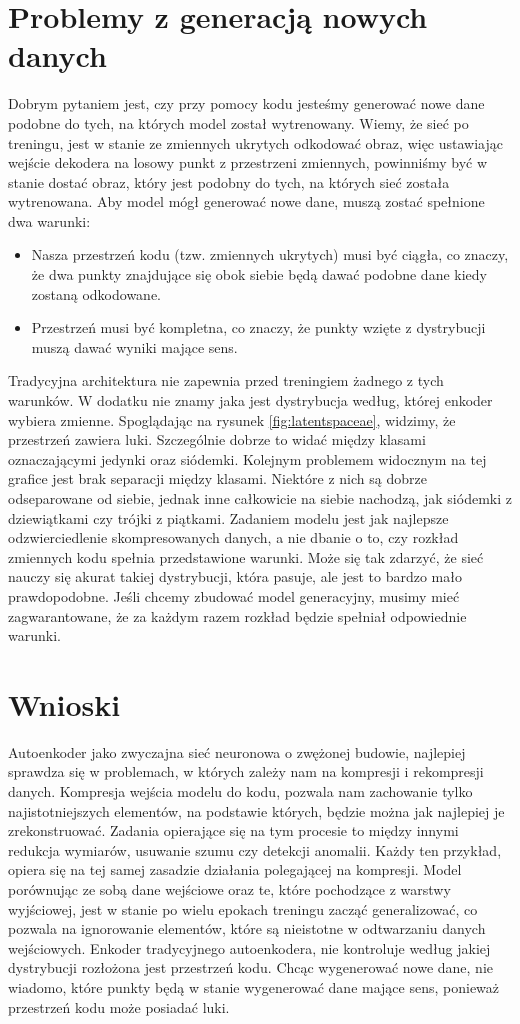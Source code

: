 \documentclass[a4paper,12pt,oneside]{book} %
\begin{document}
\section{Problemy z generacją nowych danych}
Dobrym pytaniem jest, czy przy pomocy kodu jesteśmy generować nowe dane podobne do tych, na których model został wytrenowany. Wiemy, że sieć po treningu, jest w stanie ze zmiennych ukrytych odkodować obraz, więc ustawiając wejście dekodera na losowy punkt z przestrzeni zmiennych, powinniśmy być w stanie dostać obraz, który jest podobny do tych, na których sieć została wytrenowana.
Aby model mógł generować nowe dane, muszą zostać spełnione dwa warunki:
\begin{itemize}
	\item Nasza przestrzeń kodu (tzw. zmiennych ukrytych) musi być ciągła, co znaczy, że dwa punkty znajdujące się obok siebie będą dawać podobne dane kiedy zostaną odkodowane.
	\item Przestrzeń musi być kompletna, co znaczy, że punkty wzięte z dystrybucji muszą dawać wyniki mające sens.
\end{itemize}
Tradycyjna architektura nie zapewnia przed treningiem żadnego z tych warunków. W dodatku nie znamy jaka jest dystrybucja według, której enkoder wybiera zmienne. Spoglądając na rysunek \ref{fig:latentspaceae}, widzimy, że przestrzeń zawiera luki. Szczególnie dobrze to widać między klasami oznaczającymi jedynki oraz siódemki. Kolejnym problemem widocznym na tej grafice jest brak separacji między klasami. Niektóre z nich są dobrze odseparowane od siebie, jednak inne całkowicie na siebie nachodzą, jak siódemki z dziewiątkami czy trójki z piątkami. Zadaniem modelu jest jak najlepsze odzwierciedlenie skompresowanych danych, a nie dbanie o to, czy rozkład zmiennych kodu spełnia przedstawione warunki. Może się tak zdarzyć, że sieć nauczy się akurat takiej dystrybucji, która pasuje, ale jest to bardzo mało prawdopodobne. Jeśli chcemy zbudować model generacyjny, musimy mieć zagwarantowane, że za każdym razem rozkład będzie spełniał odpowiednie warunki.
\section{Wnioski}
Autoenkoder jako zwyczajna sieć neuronowa o zwężonej budowie, najlepiej sprawdza się w problemach, w których zależy nam na kompresji i rekompresji danych. Kompresja wejścia modelu do kodu, pozwala nam zachowanie tylko najistotniejszych elementów, na podstawie których, będzie można jak najlepiej je zrekonstruować. Zadania opierające się na tym procesie to między innymi redukcja wymiarów, usuwanie szumu czy detekcji anomalii. Każdy ten przykład, opiera się na tej samej zasadzie działania polegającej na kompresji. Model porównując ze sobą dane wejściowe oraz te, które pochodzące z warstwy wyjściowej, jest w stanie po wielu epokach treningu zacząć generalizować, co pozwala na ignorowanie elementów, które są nieistotne w odtwarzaniu danych wejściowych. Enkoder tradycyjnego autoenkodera, nie kontroluje według jakiej dystrybucji rozłożona jest przestrzeń kodu. Chcąc wygenerować nowe dane, nie wiadomo, które punkty będą w stanie wygenerować dane mające sens, ponieważ przestrzeń kodu może posiadać luki.
 
\end{document}
